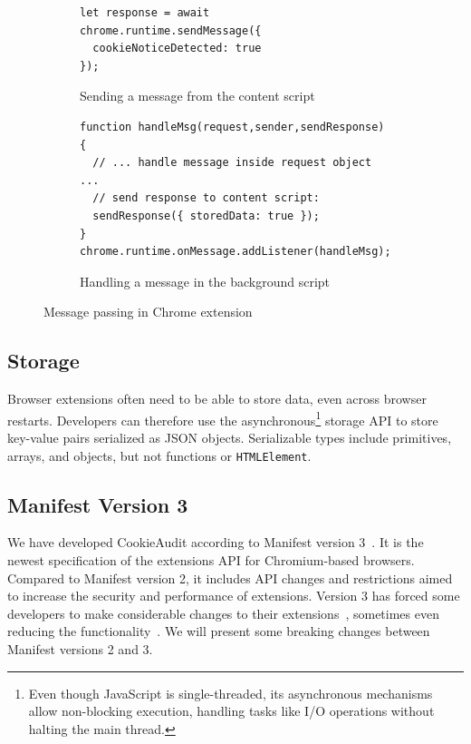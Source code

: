 \begin{figure}
	\centering
	    
	\begin{subfigure}{\textwidth}
		\centering
		\begin{lstlisting}
let response = await chrome.runtime.sendMessage({
  cookieNoticeDetected: true
});
		\end{lstlisting}
		\caption{Sending a message from the content script}
	\end{subfigure}
	    
	\begin{subfigure}{\textwidth}
		\centering
		\begin{lstlisting}
function handleMsg(request,sender,sendResponse) {
  // ... handle message inside request object ...
  // send response to content script:
  sendResponse({ storedData: true });
}
chrome.runtime.onMessage.addListener(handleMsg);
		\end{lstlisting}
		\caption{Handling a message in the background script}
	\end{subfigure}
	    
	\caption{Message passing in Chrome extension}
	\label{fig:message-passing}
\end{figure}

\subsection{Storage} \label{subsec:storage}
Browser extensions often need to be able to store data, even across browser restarts.
Developers can therefore use the asynchronous\footnote{Even though JavaScript is single-threaded, its asynchronous mechanisms allow non-blocking execution, handling tasks like I/O operations without halting the main thread.} storage API to store key-value pairs serialized as JSON objects. Serializable types include primitives, arrays, and objects, but not functions or \texttt{HTMLElement}.

\subsection{Manifest Version 3} \label{subsec:manifest-v3}
We have developed CookieAudit according to Manifest version 3~\cite{manifestv3}.
It is the newest specification of the extensions API for Chromium-based browsers.
Compared to Manifest version 2, it includes API changes and restrictions aimed to increase the security and performance of extensions.
Version 3 has forced some developers to make considerable changes to their extensions~\cite{purdy2024chrome, huczynski2018ublock}, sometimes even reducing the functionality~\cite{hill2024google}.
We will present some breaking changes between Manifest versions 2 and 3.

